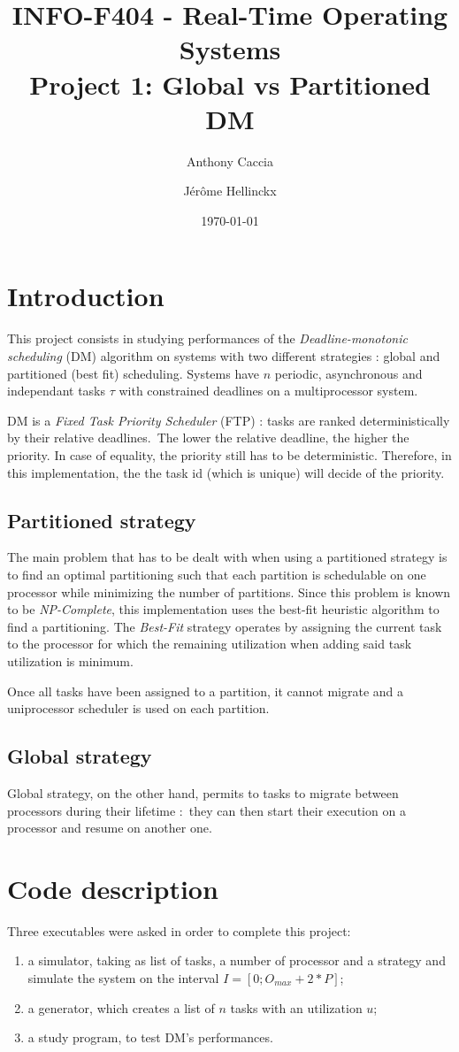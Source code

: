 \documentclass{scrartcl}
\title{INFO-F404 - Real-Time Operating Systems\\Project 1: Global vs Partitioned DM}
\author{Anthony Caccia \and J\'{e}r\^{o}me Hellinckx}
\date{\today}
\begin{document}
\maketitle

\section{Introduction}
This project consists in studying performances of the \emph{Deadline-monotonic scheduling} (DM) algorithm on systems with two different strategies : global and partitioned (best fit) scheduling. Systems have $n$ periodic, asynchronous and independant tasks $\tau$ with constrained deadlines on a multiprocessor system.

DM is a \emph{Fixed Task Priority Scheduler} (FTP) : tasks are ranked deterministically by their relative deadlines. The lower the relative deadline, the higher the priority. In case of equality, the priority still has to be deterministic. Therefore, in this implementation, the the task id (which is unique) will decide of the priority.

\subsection{Partitioned strategy}
The main problem that has to be dealt with when using a partitioned strategy is to find an optimal partitioning such that each partition is schedulable on one processor while minimizing the number of partitions. Since this problem is known to be \emph{NP-Complete}, this implementation uses the best-fit heuristic algorithm to find a partitioning. The \emph{Best-Fit} strategy operates by assigning the current task to the processor for which the remaining utilization when adding said task utilization is minimum.

Once all tasks have been assigned to a partition, it cannot migrate and a uniprocessor scheduler is used on each partition. 

\subsection{Global strategy}
Global strategy, on the other hand, permits to tasks to migrate between processors during their lifetime : they can then start their execution on a processor and resume on another one.

\section{Code description}
Three executables were asked in order to complete this project:
\begin{enumerate}
  \item a simulator, taking as list of tasks, a number of processor and a strategy and simulate the system on the interval $I = [0; O_{max} + 2 * P]$;
  \item a generator, which creates a list of $n$ tasks with an utilization $u$;
  \item a study program, to test DM's performances.
\end{enumerate}
\end{document}
